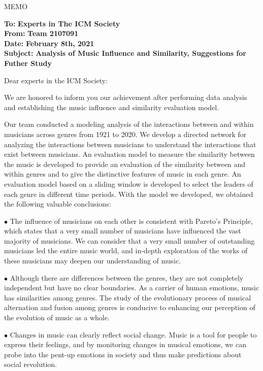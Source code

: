 \documentclass[12pt]{article}  %
\begin{document}
\begin{letter}{MEMO\centering}
	\begin{flushleft}  %
		\textbf{To:} \textbf{Experts in The ICM Society}\\
		\textbf{From:} \textbf{Team 2107091}\\
		\textbf{Date:} \textbf{February 8th, 2021}\\
		\textbf{Subject:} \textbf{Analysis of Music Influence and Similarity, Suggestions for Futher Study}
	\end{flushleft}

\noindent Dear experts in the ICM Society:

 We are honored to inform you our achievement after  performing data analysis and establishing the music influence and similarity evaluation model. 

Our team conducted a modeling analysis of the interactions between and within musicians across genres from 1921 to 2020. We develop a directed network for analyzing the interactions between musicians to understand the interactions that exist between musicians. An evaluation model to measure the similarity between the music is developed to provide an evaluation of the similarity between and within genres and to give the distinctive features of music in each genre. An evaluation model based on a sliding window is developed to select the leaders of each genre in different time periods. With the model we developed, we obtained the following valuable conclusions:

$\bullet$ The influence of musicians on each other is consistent with Pareto's Principle, which states that a very small number of musicians have influenced the vast majority of musicians. We can consider that a very small number of outstanding musicians led the entire music world, and in-depth exploration of the works of these musicians may deepen our understanding of music.

$\bullet$ Although there are differences between the genres, they are not completely independent but have no clear boundaries. As a carrier of human emotions, music has similarities among genres. The study of the evolutionary process of musical alternation and fusion among genres is conducive to enhancing our perception of the evolution of music as a whole.

$\bullet$ Changes in music can clearly reflect social change. Music is a tool for people to express their feelings, and by monitoring changes in musical emotions, we can probe into the pent-up emotions in society and thus make predictions about social revolution.


\end{letter}
\end{document}
